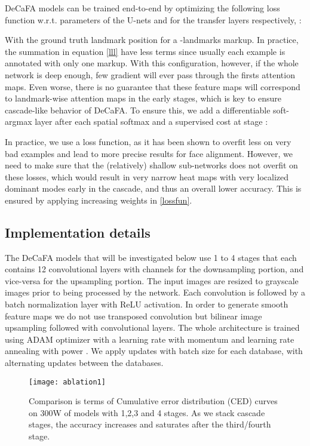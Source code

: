 \documentclass[10pt,twocolumn,letterpaper]{article}
\begin{document}
DeCaFA models can be trained end-to-end by optimizing the following loss function w.r.t. parameters of the U-nets  and  for the transfer layers  respectively, :



With  the ground truth landmark position for a -landmarks markup. In practice, the summation in equation \eqref{lll} have less terms since usually each example is annotated with only one markup. With this configuration, however, if the whole network is deep enough, few gradient will ever pass through the firsts attention maps. Even worse, there is no guarantee that these feature maps will correspond to landmark-wise attention maps in the early stages, which is key to ensure cascade-like behavior of DeCaFA. To ensure this, we add a differentiable soft-argmax layer after each spatial softmax and a supervised cost at stage :



In practice, we use a  loss function, as it has been shown to overfit less on very bad examples and lead to more precise results for face alignment. However, we need to make sure that the (relatively) shallow sub-networks does not overfit on these losses, which would result in very narrow heat maps with very localized dominant modes early in the cascade, and thus an overall lower accuracy. This is ensured by applying increasing  weights in \eqref{lossfun}.

\subsection{Implementation details}\label{implemdetail}

The DeCaFA models that will be investigated below use 1 to 4 stages that each contains 12  convolutional layers with  channels for the downsampling portion, and vice-versa for the upsampling portion. The input images are resized to  grayscale images prior to being processed by the network. Each convolution is followed by a batch normalization layer with ReLU activation. In order to generate smooth feature maps we do not use transposed convolution but bilinear image upsampling followed with  convolutional layers. The whole architecture is trained using ADAM optimizer with a  learning rate with momentum  and learning rate annealing with power . We apply  updates with batch size  for each database, with alternating updates between the databases.

\begin{figure*}[h!]
	\centering
	\texttt{[image: ablation1]}
	\caption{Comparison is terms of Cumulative error distribution (CED) curves on 300W of models with  1,2,3 and 4 stages. As we stack cascade stages, the accuracy increases and saturates after the third/fourth stage.}
	\label{ced}
\end{figure*}
\end{document}
